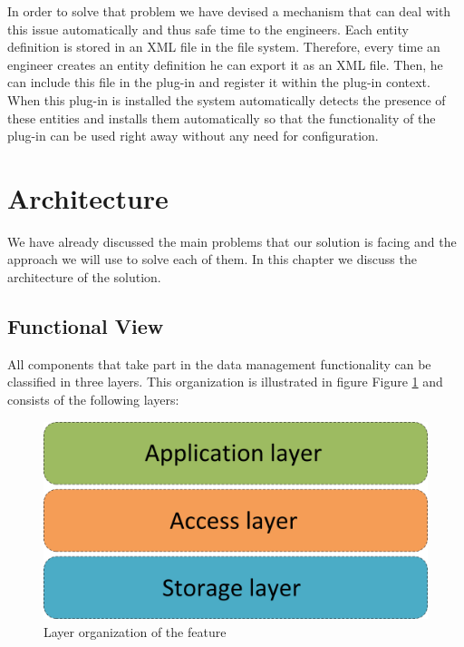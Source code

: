 In order to solve that problem we have devised a mechanism that can deal with this issue automatically and thus safe time to the engineers. Each entity definition is stored in an XML file in the file system. Therefore, every time an engineer creates an entity definition he can export it as an XML file. Then, he can include this file in the plug-in and register it within the plug-in context. When this plug-in is installed the system automatically detects the presence of these entities and installs them automatically so that the functionality of the plug-in can be used right away without any need for configuration.

\section{Architecture}
\label{sec:architectureStorage}

We have already discussed the main problems that our solution is facing and the approach we will use to solve each of them. In this chapter we discuss the architecture of the solution.

\subsection{Functional View}

All components that take part in the data management functionality can be classified in three layers. This organization is illustrated in figure Figure \ref{fig:storageLayers} and consists of the following layers:

\begin{figure}[h!]
  \centering
  	\includegraphics[scale=0.4]{storage/functional/layers.png}
  \caption{Layer organization of the feature}
  \label{fig:storageLayers}
\end{figure}

